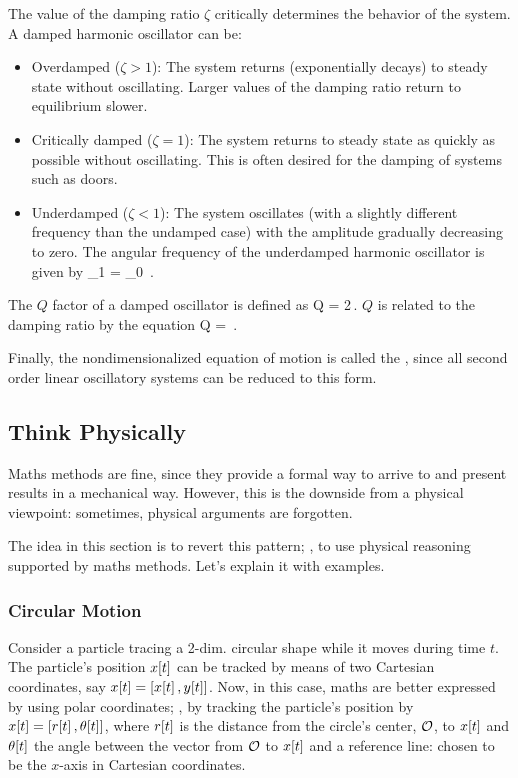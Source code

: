 The value of the damping ratio $\zeta$ critically determines the behavior of the system. A damped harmonic oscillator can be:
\begin{itemize}
\item Overdamped ($\zeta > 1$): The system returns (exponentially decays) to steady state without oscillating. Larger values of the damping ratio return to equilibrium slower.
%
\item Critically damped ($\zeta = 1$): The system returns to steady state as quickly as possible without oscillating. This is often desired for the damping of systems such as doors.
%
\item Underdamped ($\zeta < 1$): The system oscillates (with a slightly different frequency than the undamped case) with the amplitude gradually decreasing to zero. The angular frequency of the underdamped harmonic oscillator is given by
\beq
\omega_1 = \omega_0 \,.
\eeq
\end{itemize}

The $Q$ factor of a damped oscillator is defined as
\beq
Q = 2\pi{}\,.
\eeq
$Q$ is related to the damping ratio by the equation 
\beq
Q = \,.
\eeq

Finally, the nondimensionalized equation of motion is called the , since all second order linear oscillatory systems can be reduced to this form.


\subsection{Think Physically}
Maths methods are fine, since they provide a formal way to arrive to and present results in a mechanical way. However, this is the downside from a physical viewpoint: sometimes, physical arguments are forgotten.

The idea in this section is to revert this pattern; \ie, to use physical reasoning supported by maths methods. Let's explain it with examples.


\subsubsection{Circular Motion}
Consider a particle tracing a 2-dim. circular shape while it moves during time $t$. The particle's position $x\!\left[{t}\right]$ can be tracked by means of two Cartesian coordinates, say $x\!\left[{t}\right] = \left[{x\!\left[{t}\right], y\!\left[{t}\right]}\right]$. Now, in this case, maths are better expressed by using polar coordinates; \ie, by tracking the particle's position by $x\!\left[{t}\right] = \left[{r\!\left[{t}\right], \theta\!\left[{t}\right]}\right]$, where $r\!\left[{t}\right]$ is the distance from the circle's center, $\mathcal{O}$, to $x\!\left[{t}\right]$ and $\theta\!\left[{t}\right]$ the angle between the vector from $\mathcal{O}$ to $x\!\left[{t}\right]$ and a reference line: chosen to be the $x$-axis in Cartesian coordinates.

